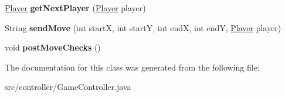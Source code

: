 \begin{DoxyCompactItemize}
\item 
\hypertarget{classcontroller_1_1_game_controller_a56517296ccfdfaee221ad1793d638b60}{\hyperlink{classmodel_1_1player_1_1_player}{Player} {\bfseries get\-Next\-Player} (\hyperlink{classmodel_1_1player_1_1_player}{Player} player)}\label{classcontroller_1_1_game_controller_a56517296ccfdfaee221ad1793d638b60}

\item 
\hypertarget{classcontroller_1_1_game_controller_a2268213da474366c1fad406a002ded20}{String {\bfseries send\-Move} (int start\-X, int start\-Y, int end\-X, int end\-Y, \hyperlink{classmodel_1_1player_1_1_player}{Player} player)}\label{classcontroller_1_1_game_controller_a2268213da474366c1fad406a002ded20}

\item 
\hypertarget{classcontroller_1_1_game_controller_a61b4511dbbfbb2894eb753b6da6f1723}{void {\bfseries post\-Move\-Checks} ()}\label{classcontroller_1_1_game_controller_a61b4511dbbfbb2894eb753b6da6f1723}

\end{DoxyCompactItemize}


The documentation for this class was generated from the following file\-:\begin{DoxyCompactItemize}
\item 
src/controller/Game\-Controller.\-java\end{DoxyCompactItemize}
